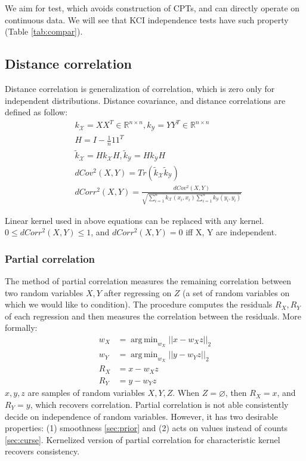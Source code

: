 \documentclass{article} %
\DeclareMathOperator*{\argmin}{arg\,min}
\begin{document}
We aim for test, which avoids construction of CPTs, and can directly operate on continuous data.
We will see that KCI independence tests have such property (Table \ref{tab:compar}).

\subsection{Distance correlation}\label{sec:dist}
Distance correlation \cite{szekely2007measuring} is generalization of correlation, which is zero only for independent distributions.
Distance covariance, and distance correlations are defined as follow:
\begin{align*}
  &k_\mathcal{X} = XX^T \in \mathbb{R}^{n \times n},
  k_\mathcal{Y} = YY^T \in \mathbb{R}^{n \times n}\\
  &H = I - \frac{1}{n}11^T \\
  &\tilde{k}_\mathcal{X} = Hk_{\mathcal{X}}H, 
  \tilde{k}_\mathcal{Y} = Hk_{\mathcal{Y}}H \\
  &dCov^2(X, Y) = Tr(\tilde{k}_\mathcal{X}\tilde{k}_\mathcal{Y}) \\
  &dCorr^2(X, Y) = \frac{dCov^2(X, Y)}{\sqrt{\sum_{i=1}^nk_{\mathcal{X}}(x_i, x_i) \sum_{i=1}^nk_{\mathcal{Y}}(y_i, y_i)}} 
\end{align*}

Linear kernel used in above equations can be replaced with any kernel. $0 \leq dCorr^2(X, Y) \leq 1$, and $dCorr^2(X, Y) = 0$ iff X, Y are independent. 

\subsubsection{Partial correlation}\label{sec:corr}
The method of partial correlation measures the remaining correlation between two random variables $X, Y$ after regressing on $Z$ (a set of random 
variables on which we would like to condition).  The procedure computes the residuals $R_X, R_Y$ of each regression and then measures the correlation between the residuals. More formally:
\begin{align*}
  w_X &= \argmin_{w_X} ||x - w_X z||_{2} \\
  w_Y &= \argmin_{w_X} ||y - w_Y z||_{2} \\
  R_X &= x - w_X z \\
  R_Y &= y - w_Y z
\end{align*}
$x, y, z$ are samples of random variables $X, Y, Z$. When $Z = \varnothing$, then $R_X = x$, and $R_Y = y$, which
recovers correlation. Partial correlation is not able consistently decide
on independence of random variables. However, it has two desirable properties: (1) smoothness \ref{sec:prior} and (2)
acts on values instead of counts \ref{sec:curse}. Kernelized version of partial correlation for 
characteristic kernel recovers consistency.
\end{document}
